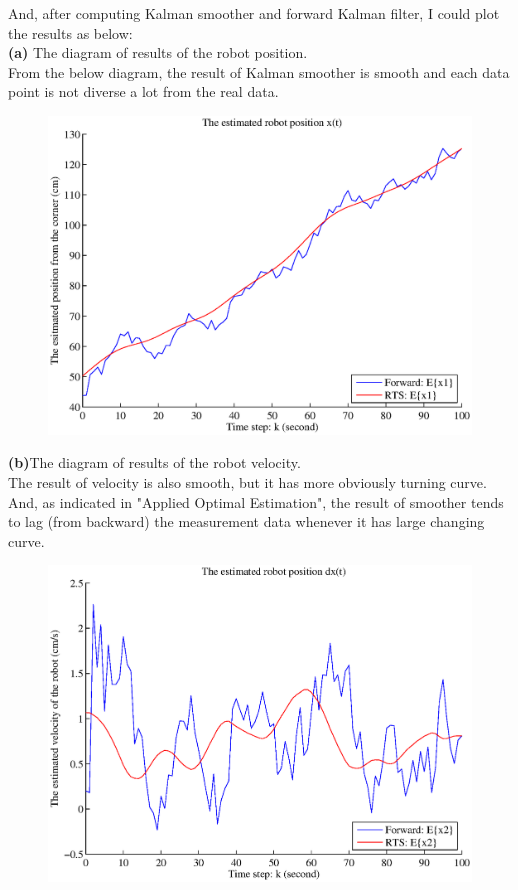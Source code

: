 \documentclass{article}
\begin{document}
And, after computing Kalman smoother and forward Kalman filter, I could plot the results as below:\\
\textbf{(a)} The diagram of results of the robot position.\\
From the below diagram, the result of Kalman smoother is smooth and each data point is not diverse a lot from the real data. 

\begin{figure}[H]
\begin{center}
\includegraphics[scale=0.6]{hw7_x1.eps}
\end{center}
\end{figure}

\textbf{(b)}The diagram of results of the robot velocity.\\
The result of velocity is also smooth, but it has more obviously turning curve. And, as indicated in "Applied Optimal Estimation",
the result of smoother tends to lag (from backward) the measurement data whenever it has large changing curve.

\begin{figure}[H]
\begin{center}
\includegraphics[scale=0.6]{hw7_x2.eps}
\end{center}
\end{figure}
\end{document}
